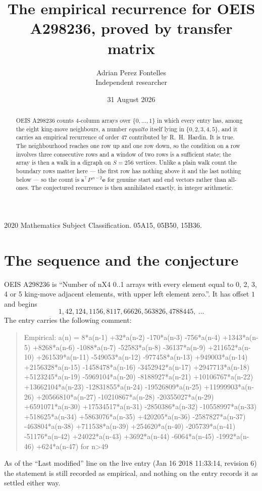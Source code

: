 \documentclass[11pt,a4paper]{article}
\title{The empirical recurrence for OEIS A298236, proved by transfer matrix}
\author{Adrian Perez Fontelles\\ \small Independent researcher}
\date{31 August 2026}
\theoremstyle{plain}
\theoremstyle{definition}
\begin{document}
\maketitle

\begin{abstract}
OEIS A298236 counts $4$-column arrays over $\{0,\dots,1\}$ in which every entry has,
among the eight king-move neighbours, a number $equal to$ itself lying in $\{0,2,3,4,5\}$, and it carries an empirical
recurrence of order $47$ contributed by R.~H.~Hardin. It is true. The neighbourhood
reaches one row up and one row down, so the condition on a row involves three consecutive
rows and a window of two rows is a sufficient state; the array is then a walk in a digraph
on $S=256$ vertices. Unlike a plain walk count the boundary rows matter here --- the first
row has nothing above it and the last nothing below --- so the count is
$\mathbf{s}^{\!\top}P^{\,n-2}\mathbf{e}$ for genuine start and end vectors rather than
all-ones. The conjectured recurrence is then annihilated exactly, in integer arithmetic.
\end{abstract}

\noindent\small 2020 Mathematics Subject Classification. 05A15, 05B50, 15B36.\normalsize

\section{The sequence and the conjecture}

OEIS A298236 is ``Number of nX4 0..1 arrays with every element equal to 0, 2, 3, 4 or 5 king-move adjacent elements, with upper left element zero.''. It has offset
$1$ and begins
\[
1, 42, 124, 1156, 8117, 66626, 563826, 4788445,\ \dots
\]
The entry carries the following comment:
\begin{quote}\small
Empirical: a(n) = 8*a(n-1) +32*a(n-2) -170*a(n-3) -756*a(n-4) +1343*a(n-5) +8268*a(n-6) -1088*a(n-7) -52583*a(n-8) -36137*a(n-9) +211652*a(n-10) +261539*a(n-11) -549053*a(n-12) -977458*a(n-13) +949003*a(n-14) +2156328*a(n-15) -1458478*a(n-16) -3452942*a(n-17) +2947713*a(n-18) +5123245*a(n-19) -5969104*a(n-20) -8188927*a(n-21) +10106767*a(n-22) +13662104*a(n-23) -12831855*a(n-24) -19526809*a(n-25) +11999903*a(n-26) +20566810*a(n-27) -10210867*a(n-28) -20355027*a(n-29) +6591071*a(n-30) +17534517*a(n-31) -2850386*a(n-32) -10558997*a(n-33) +518625*a(n-34) +5863076*a(n-35) +420205*a(n-36) -2587827*a(n-37) -463804*a(n-38) +711538*a(n-39) +254620*a(n-40) -205739*a(n-41) -51176*a(n-42) +24022*a(n-43) +3692*a(n-44) -6064*a(n-45) -1992*a(n-46) +624*a(n-47) for n>49
\end{quote}
As of the ``Last modified'' line on the live entry (Jan 16 2018 11:33:14, revision
6) the statement is still recorded as empirical, and nothing on the entry
records it as settled either way.
\end{document}
